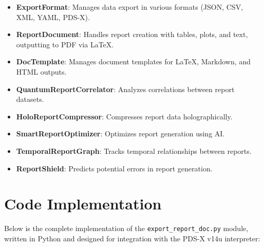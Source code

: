 \documentclass[a4paper,12pt]{article}
\begin{document}
\begin{itemize}
    \item \textbf{ExportFormat}: Manages data export in various formats (JSON, CSV, XML, YAML, PDS-X).
    \item \textbf{ReportDocument}: Handles report creation with tables, plots, and text, outputting to PDF via LaTeX.
    \item \textbf{DocTemplate}: Manages document templates for LaTeX, Markdown, and HTML outputs.
    \item \textbf{QuantumReportCorrelator}: Analyzes correlations between report datasets.
    \item \textbf{HoloReportCompressor}: Compresses report data holographically.
    \item \textbf{SmartReportOptimizer}: Optimizes report generation using AI.
    \item \textbf{TemporalReportGraph}: Tracks temporal relationships between reports.
    \item \textbf{ReportShield}: Predicts potential errors in report generation.
\end{itemize}

\section{Code Implementation}
Below is the complete implementation of the \texttt{export\_report\_doc.py} module, written in Python and designed for integration with the PDS-X v14u interpreter:
\end{document}

